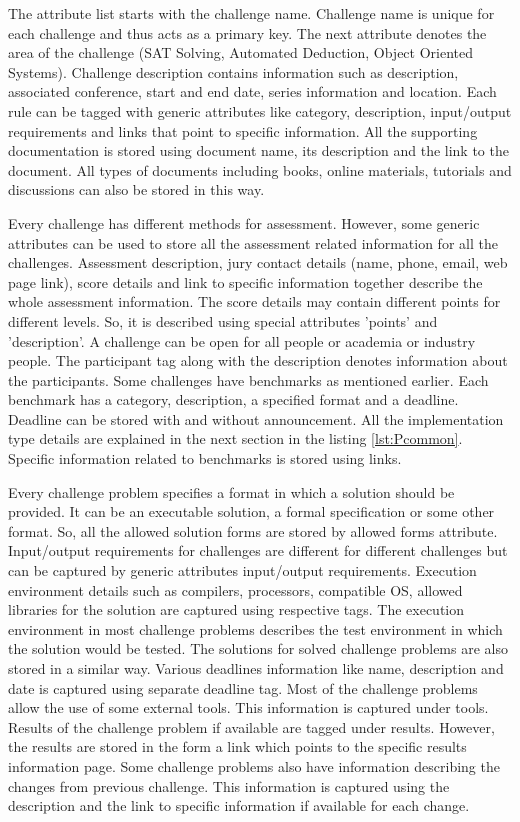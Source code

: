 \documentclass[11pt,letterpaper]{report}
\begin{document}
The attribute list starts with the challenge name. Challenge name is unique for each challenge and thus acts as a primary key. The next attribute denotes the area of the challenge (SAT Solving, Automated Deduction, Object Oriented Systems). Challenge description contains information such as description, associated conference, start and end date, series information and location. Each rule can be tagged with generic attributes like category, description, input/output requirements and links that point to specific information. All the supporting documentation is stored using document name, its description and the link to the document. All types of documents including books, online materials, tutorials and discussions can also be stored in this way. 

Every challenge has different methods for assessment. However, some generic attributes can be used to store all the assessment related information for all the challenges. Assessment description, jury contact details (name, phone, email, web page link), score details and link to specific information together describe the whole assessment information. The score details may contain different points for different levels. So, it is described using special attributes 'points' and 'description'. A challenge can be open for all people or academia or industry people. The participant tag along with the description denotes information about the participants. Some challenges have benchmarks as mentioned earlier. Each benchmark has a category, description, a specified format and a deadline. Deadline can be stored with and without announcement. All the implementation type details are explained in the next section in the listing \ref{lst:Pcommon}. Specific information related to benchmarks is stored using links.

Every challenge problem specifies a format in which a solution should be provided. It can be an executable solution, a formal specification or some other format. So, all the allowed solution forms are stored by allowed forms attribute. Input/output requirements for challenges are different for different challenges but can be captured by generic attributes input/output requirements. Execution environment details such as compilers, processors, compatible OS, allowed libraries for the solution are captured using respective tags. The execution environment in most challenge problems describes the test environment in which the solution would be tested.  The solutions for solved challenge problems are also stored in a similar way. Various deadlines information like name, description and date is captured using separate deadline tag. Most of the challenge problems allow the use of some external tools. This information is captured under tools. Results of the challenge problem if available are tagged under results. However, the results are stored in the form a link which points to the specific results information page. Some challenge problems also have information describing the changes from previous challenge. This information is captured using the description and the link to specific information if available for each change.    
\end{document}
